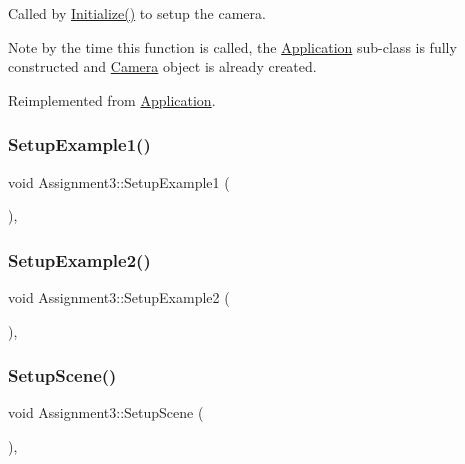 Called by \hyperlink{class_application_a17cf1ea4552d26a1c20f7d98d793d41d}{Initialize()} to setup the camera. 

Note by the time this function is called, the \hyperlink{class_application}{Application} sub-\/class is fully constructed and \hyperlink{class_camera}{Camera} object is already created. 

Reimplemented from \hyperlink{class_application_a2eb61ca027f223a5c5ad1bf982481193}{Application}.

\hypertarget{class_assignment3_a468c30083d6f75d99cd1fe41205983dc}{}\label{class_assignment3_a468c30083d6f75d99cd1fe41205983dc} 
\subsubsection{\texorpdfstring{Setup\+Example1()}{SetupExample1()}}
{\footnotesize\ttfamily void Assignment3\+::\+Setup\+Example1 (\begin{DoxyParamCaption}{ }\end{DoxyParamCaption})\hspace{0.3cm}{\ttfamily [private]}, {\ttfamily [virtual]}}

\hypertarget{class_assignment3_af6d27b156c0781ff6aba450bd78b61ff}{}\label{class_assignment3_af6d27b156c0781ff6aba450bd78b61ff} 
\subsubsection{\texorpdfstring{Setup\+Example2()}{SetupExample2()}}
{\footnotesize\ttfamily void Assignment3\+::\+Setup\+Example2 (\begin{DoxyParamCaption}{ }\end{DoxyParamCaption})\hspace{0.3cm}{\ttfamily [private]}, {\ttfamily [virtual]}}

\hypertarget{class_assignment3_a2dc29d9016a9d822ede84b9ef41429a5}{}\label{class_assignment3_a2dc29d9016a9d822ede84b9ef41429a5} 
\subsubsection{\texorpdfstring{Setup\+Scene()}{SetupScene()}}
{\footnotesize\ttfamily void Assignment3\+::\+Setup\+Scene (\begin{DoxyParamCaption}{ }\end{DoxyParamCaption})\hspace{0.3cm}{\ttfamily [private]}, {\ttfamily [virtual]}}



